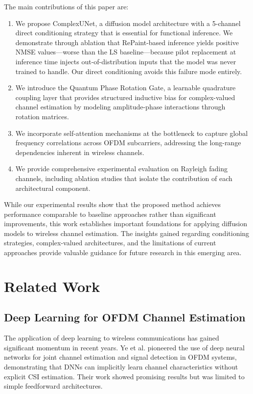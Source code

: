 \documentclass[conference]{IEEEtran}
\begin{document}
The main contributions of this paper are:

\begin{enumerate}
\item We propose ComplexUNet, a diffusion model architecture with a 5-channel direct conditioning strategy that is essential for functional inference. We demonstrate through ablation that RePaint-based inference yields positive NMSE values—worse than the LS baseline—because pilot replacement at inference time injects out-of-distribution inputs that the model was never trained to handle. Our direct conditioning avoids this failure mode entirely.

\item We introduce the Quantum Phase Rotation Gate, a learnable quadrature coupling layer that provides structured inductive bias for complex-valued channel estimation by modeling amplitude-phase interactions through rotation matrices.

\item We incorporate self-attention mechanisms at the bottleneck to capture global frequency correlations across OFDM subcarriers, addressing the long-range dependencies inherent in wireless channels.

\item We provide comprehensive experimental evaluation on Rayleigh fading channels, including ablation studies that isolate the contribution of each architectural component.
\end{enumerate}

While our experimental results show that the proposed method achieves performance comparable to baseline approaches rather than significant improvements, this work establishes important foundations for applying diffusion models to wireless channel estimation. The insights gained regarding conditioning strategies, complex-valued architectures, and the limitations of current approaches provide valuable guidance for future research in this emerging area.


\section{Related Work}

\subsection{Deep Learning for OFDM Channel Estimation}

The application of deep learning to wireless communications has gained significant momentum in recent years. Ye et al. \cite{ye2017power} pioneered the use of deep neural networks for joint channel estimation and signal detection in OFDM systems, demonstrating that DNNs can implicitly learn channel characteristics without explicit CSI estimation. Their work showed promising results but was limited to simple feedforward architectures.
\end{document}
